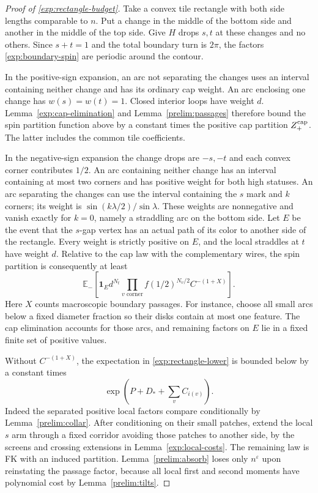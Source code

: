 \begin{proof}[Proof of \eqref{exp:rectangle-budget}]
Take a convex tile rectangle with both side lengths comparable to $n$.
Put a change in the middle of the bottom side and another in the middle
of the top side. Give $H$ drops $s,t$ at these changes and no others.
Since $s+t=1$ and the total boundary turn is $2\pi$, the factors
\eqref{exp:boundary-spin} are periodic around the contour.

In the positive-sign expansion, an arc not separating the changes uses
an interval containing neither change and has its ordinary cap weight.
An arc enclosing one change has $w(s)=w(t)=1$. Closed interior loops
have weight $d$. Lemma~\ref{exp:cap-elimination} and
Lemma~\ref{prelim:passages} therefore bound the spin partition function
above by a constant times the positive cap partition $Z_+^{\rm cap}$.
The latter includes the common tile coefficients.

In the negative-sign expansion the change drops are $-s,-t$ and each
convex corner contributes $1/2$. An arc containing neither change has
an interval containing at most two corners and has positive weight for
both high statuses. An arc separating the changes can use the interval
containing the $s$ mark and $k$ corners; its weight is
$\sin(k\lambda/2)/\sin\lambda$. These weights are nonnegative and
vanish exactly for $k=0$, namely a straddling arc on the bottom side.
Let $E$ be the event that the $s$-gap vertex has an actual path of its
color to another side of the rectangle. Every weight is strictly
positive on $E$, and the local straddles at $t$ have weight $d$.
Relative to the cap law with the complementary wires, the spin
partition is consequently at least
\begin{equation}\label{exp:rectangle-lower}
 \mathbb E_-
 \left[\mathbf1_E d^{N_t}
    \prod_{v\text{ corner}} f(1/2)^{N_v/2}
    C^{-(1+X)}\right].
\end{equation}
Here $X$ counts macroscopic boundary passages. For instance, choose all
small arcs below a fixed diameter fraction so their disks contain at
most one feature. The cap elimination accounts for those arcs, and
remaining factors on $E$ lie in a fixed finite set of positive values.

Without $C^{-(1+X)}$, the expectation in
\eqref{exp:rectangle-lower} is bounded below by a constant times
\[
 \exp\left(P+D_*+\sum_v C_{i(v)}\right).
\]
Indeed the separated positive local factors compare conditionally by
Lemma~\ref{prelim:collar}. After conditioning on their small patches,
extend the local $s$ arm through a fixed corridor avoiding those patches
to another side, by the screens and crossing extensions in
Lemma~\ref{exp:local-costs}. The remaining law is FK with an induced
partition. Lemma~\ref{prelim:absorb} loses only
$n^\varepsilon$ upon reinstating the passage factor, because all local
first and second moments have polynomial cost by
Lemma~\ref{prelim:tilts}.


\end{proof}
